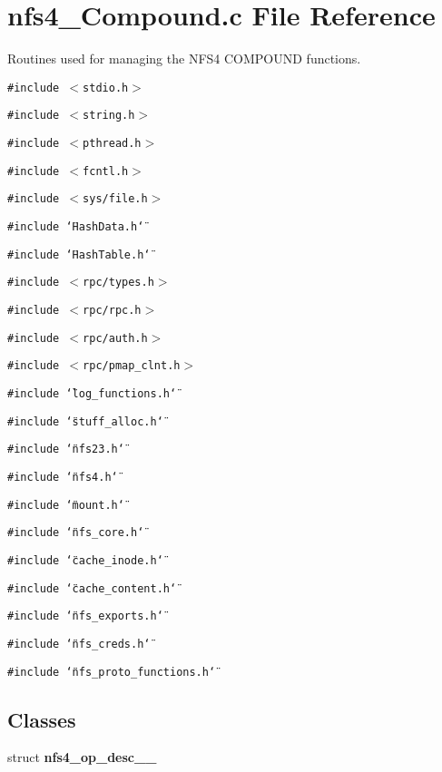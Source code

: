 \section{nfs4\_\-Compound.c File Reference}
\label{nfs4__Compound_8c}
Routines used for managing the NFS4 COMPOUND functions. 

{\tt \#include $<$stdio.h$>$}\par
{\tt \#include $<$string.h$>$}\par
{\tt \#include $<$pthread.h$>$}\par
{\tt \#include $<$fcntl.h$>$}\par
{\tt \#include $<$sys/file.h$>$}\par
{\tt \#include \char`\"{}Hash\-Data.h\char`\"{}}\par
{\tt \#include \char`\"{}Hash\-Table.h\char`\"{}}\par
{\tt \#include $<$rpc/types.h$>$}\par
{\tt \#include $<$rpc/rpc.h$>$}\par
{\tt \#include $<$rpc/auth.h$>$}\par
{\tt \#include $<$rpc/pmap\_\-clnt.h$>$}\par
{\tt \#include \char`\"{}log\_\-functions.h\char`\"{}}\par
{\tt \#include \char`\"{}stuff\_\-alloc.h\char`\"{}}\par
{\tt \#include \char`\"{}nfs23.h\char`\"{}}\par
{\tt \#include \char`\"{}nfs4.h\char`\"{}}\par
{\tt \#include \char`\"{}mount.h\char`\"{}}\par
{\tt \#include \char`\"{}nfs\_\-core.h\char`\"{}}\par
{\tt \#include \char`\"{}cache\_\-inode.h\char`\"{}}\par
{\tt \#include \char`\"{}cache\_\-content.h\char`\"{}}\par
{\tt \#include \char`\"{}nfs\_\-exports.h\char`\"{}}\par
{\tt \#include \char`\"{}nfs\_\-creds.h\char`\"{}}\par
{\tt \#include \char`\"{}nfs\_\-proto\_\-functions.h\char`\"{}}\par
\subsection*{Classes}
\begin{CompactItemize}
\item 
struct {\bf nfs4\_\-op\_\-desc\_\-\_\-}
\end{CompactItemize}
